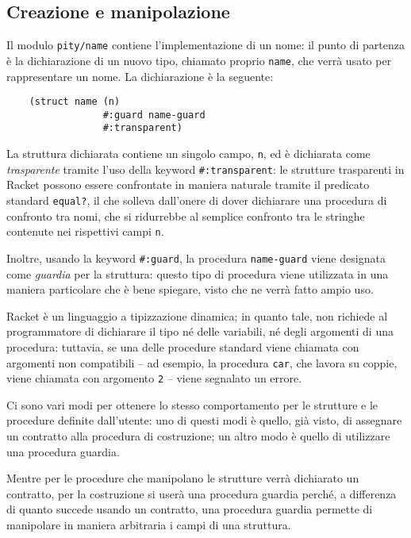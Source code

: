 \subsection{Creazione e manipolazione}

Il modulo \lstinline{pity/name} contiene l'implementazione di un nome: il
punto di partenza \`e la dichiarazione di un nuovo tipo, chiamato proprio
\lstinline{name}, che verr\`a usato per rappresentare un nome. La
dichiarazione \`e la seguente:

\begin{lstlisting}
    (struct name (n)
                 #:guard name-guard
                 #:transparent)
\end{lstlisting}

La struttura dichiarata contiene un singolo campo, \lstinline{n}, ed \`e
dichiarata come \emph{trasparente} tramite l'uso della keyword
\lstinline{#:transparent}: le strutture trasparenti in Racket possono essere
confrontate in maniera naturale tramite il predicato standard
\lstinline{equal?}, il che solleva dall'onere di dover dichiarare una
procedura di confronto tra nomi, che si ridurrebbe al semplice confronto
tra le stringhe contenute nei rispettivi campi \lstinline{n}.

Inoltre, usando la keyword \lstinline{#:guard}, la procedura
\lstinline{name-guard} viene designata come \emph{guardia} per la struttura:
questo tipo di procedura viene utilizzata in una maniera particolare che \`e
bene spiegare, visto che ne verr\`a fatto ampio uso.

Racket \`e un linguaggio a tipizzazione dinamica; in quanto tale, non
richiede al programmatore di dichiarare il tipo n\'e delle variabili, n\'e
degli argomenti di una procedura: tuttavia, se una delle procedure standard
viene chiamata con argomenti non compatibili -- ad esempio, la procedura
\lstinline{car}, che lavora su coppie, viene chiamata con argomento
\lstinline{2} --  viene segnalato un errore.

Ci sono vari modi per ottenere lo stesso comportamento per le strutture e
le procedure definite dall'utente: uno di questi modi \`e quello, gi\`a
visto, di assegnare un contratto alla procedura di costruzione; un altro
modo \`e quello di utilizzare una procedura guardia.

Mentre per le procedure che manipolano le strutture verr\`a dichiarato
un contratto, per la costruzione si user\`a una procedura guardia
perch\'e, a differenza di quanto succede usando un contratto, una
procedura guardia permette di manipolare in maniera arbitraria i campi
di una struttura.

